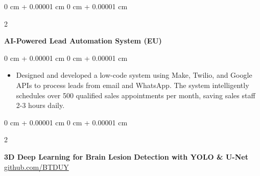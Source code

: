 \documentclass[10pt, letterpaper]{article}
\newenvironment{highlights}{
    \begin{itemize}[
        topsep=0.10 cm,
        parsep=0.10 cm,
        partopsep=0pt,
        itemsep=0pt,
        leftmargin=0 cm + 10pt
    ]
}{
    \end{itemize}
} %
\newenvironment{onecolentry}{
    \begin{adjustwidth}{
        0 cm + 0.00001 cm
    }{
        0 cm + 0.00001 cm
    }
}{
    \end{adjustwidth}
} %
\newenvironment{twocolentry}[2][]{
    \onecolentry
    \def\secondColumn{#2}
    \setcolumnwidth{\fill, 4.5 cm}
    \begin{paracol}{2}
}{
    \switchcolumn \raggedleft \secondColumn
    \end{paracol}
    \endonecolentry
} %
\begin{document}
        \vspace{0.2 cm}
        
    \begin{twocolentry}{
        }
             \textbf{AI-Powered Lead Automation System (EU)}\end{twocolentry}

        \vspace{0.10 cm}
        \begin{onecolentry}
            \begin{highlights}
                
                \item Designed  and developed a low-code system using Make, Twilio, and Google APIs to process leads from email and WhatsApp. The system intelligently schedules over 500 qualified sales appointments per month, saving sales staff 2-3 hours daily.
                
            \end{highlights}
        \end{onecolentry}
        
    \vspace{0.2 cm}
                
    \begin{twocolentry}{
            \href{https://github.com/sabbirahmed404/Brain_Tumor_Detection_Using_YOLO}{github.com/BTDUY}
        }
            \textbf{3D Deep Learning for Brain Lesion Detection with YOLO \& U-Net}\end{twocolentry}
\end{document}
